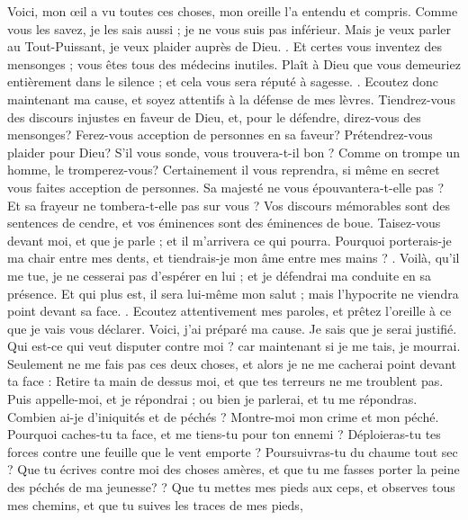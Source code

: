 \begin{multicols}{2}
\VerseOne{}Voici, mon œil a vu toutes ces choses, mon oreille l'a entendu et compris.
Comme vous les savez, je les sais aussi ; je ne vous suis pas inférieur. 
Mais je veux parler au Tout-Puissant, je veux plaider auprès de Dieu. .
Et certes vous inventez des mensonges ; vous êtes tous des médecins inutiles.
Plaît à Dieu que vous demeuriez entièrement dans le silence ; et cela vous sera réputé à sagesse. .
Ecoutez donc maintenant ma cause, et soyez attentifs à la défense de mes lèvres.
Tiendrez-vous des discours injustes en faveur de Dieu, et, pour le défendre, direz-vous des mensonges?
Ferez-vous acception de personnes en sa faveur? Prétendrez-vous plaider pour Dieu? 
S'il vous sonde, vous trouvera-t-il bon ? Comme on trompe un homme, le tromperez-vous? 
Certainement il vous reprendra, si même en secret vous faites acception de personnes.
Sa majesté ne vous épouvantera-t-elle pas ? Et sa frayeur ne tombera-t-elle pas sur vous ? 
Vos discours mémorables sont des sentences de cendre, et vos éminences sont des éminences de boue. 
Taisez-vous devant moi, et que je parle ; et il m'arrivera ce qui pourra. 
Pourquoi porterais-je ma chair entre mes dents, et tiendrais-je mon âme entre mes mains ? .
Voilà, qu'il me tue, je ne cesserai pas d'espérer en lui ; et je défendrai ma conduite en sa présence.
Et qui plus est, il sera lui-même mon salut ; mais l'hypocrite ne viendra point devant sa face. .
Ecoutez attentivement mes paroles, et prêtez l'oreille à ce que je vais vous déclarer. 
Voici, j'ai préparé ma cause. Je sais que je serai justifié.
Qui est-ce qui veut disputer contre moi ? car maintenant si je me tais, je mourrai. 
Seulement ne me fais pas ces deux choses, et alors je ne me cacherai point devant ta face :
Retire ta main de dessus moi, et que tes terreurs ne me troublent pas.
Puis appelle-moi, et je répondrai ; ou bien je parlerai, et tu me répondras. 
Combien ai-je d'iniquités et de péchés ? Montre-moi mon crime et mon péché. 
Pourquoi caches-tu ta face, et me tiens-tu pour ton ennemi ?
Déploieras-tu tes forces contre une feuille que le vent emporte ? Poursuivras-tu du chaume tout sec  ?
Que tu écrives contre moi des choses amères, et que tu me fasses porter la peine des péchés de ma jeunesse?  ?
Que tu mettes mes pieds aux ceps, et observes tous mes chemins, et que tu suives les traces de mes pieds,

\end{multicols}
